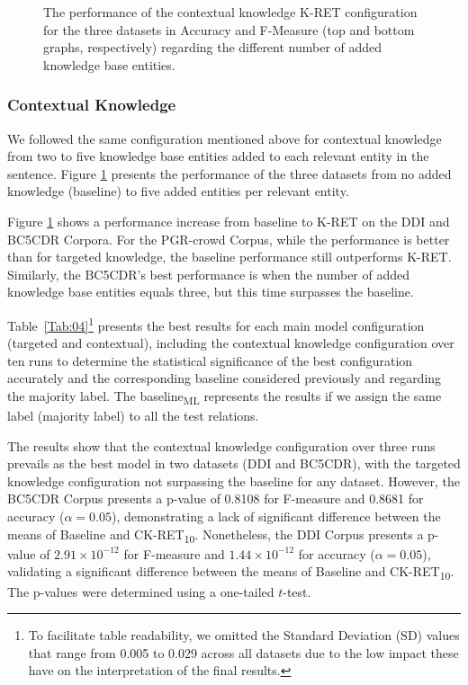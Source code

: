 \begin{figure}[H]
\begin{minipage}{0.48\textwidth}
\caption[K-RET Performance of the Contextual Knowledge Configuration]{The performance of the contextual knowledge K-RET configuration for the three datasets in Accuracy and F-Measure (top and bottom graphs, respectively) regarding the different number of added knowledge base entities.}\label{fig:55}
\end{minipage}
\end{figure}

\subsubsection{Contextual Knowledge}

We followed the same configuration mentioned above for contextual knowledge from two to five knowledge base entities added to each relevant entity in the sentence. Figure \ref{fig:55} presents the performance of the three datasets from no added knowledge (baseline) to five added entities per relevant entity. 

Figure \ref{fig:55} shows a performance increase from baseline to K-RET on the DDI and BC5CDR Corpora. For the PGR-crowd Corpus, while the performance is better than for targeted knowledge, the baseline performance still outperforms K-RET. Similarly, the BC5CDR's best performance is when the number of added knowledge base entities equals three, but this time surpasses the baseline. 

\vspace{10pt}
 
Table~\ref{Tab:04}\footnote{To facilitate table readability, we omitted the Standard Deviation (SD) values that range from 0.005 to 0.029 across all datasets due to the low impact these have on the interpretation of the final results.} presents the best results for each main model configuration (targeted and contextual), including the contextual knowledge configuration over ten runs to determine the statistical significance of the best configuration accurately and the corresponding baseline considered previously and regarding the majority label. The baseline\textsubscript{ML} represents the results if we assign the same label (majority label) to all the test relations. 

The results show that the contextual knowledge configuration over three runs prevails as the best model in two datasets (DDI and BC5CDR), with the targeted knowledge configuration not surpassing the baseline for any dataset. However, the BC5CDR Corpus presents a p-value of 0.8108 for F-measure and 0.8681 for accuracy ($\alpha = 0.05$), demonstrating a lack of significant difference between the means of Baseline and CK-RET\textsubscript{10}. Nonetheless, the DDI Corpus presents a p-value of $2.91 \times 10^{-12}$ for F-measure and $1.44 \times 10^{-12}$ for accuracy ($\alpha = 0.05$), validating a significant difference between the means of Baseline and CK-RET\textsubscript{10}. The p-values were determined using a one-tailed $t$-test.  

